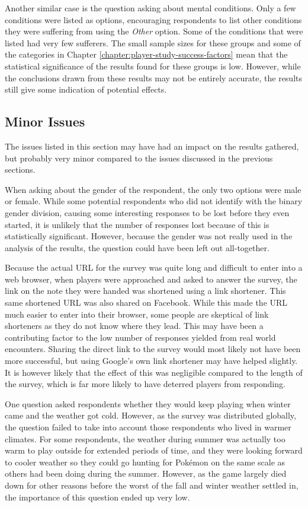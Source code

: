 Another similar case is the question asking about mental conditions. Only a few conditions were listed as options, encouraging respondents to list other conditions they were suffering from using the \emph{Other} option. Some of the conditions that were listed had very few sufferers. The small sample sizes for these groups and some of the categories in Chapter \ref{chapter:player-study-success-factors} mean that the statistical significance of the results found for these groups is low. However, while the conclusions drawn from these results may not be entirely accurate, the results still give some indication of potential effects.

\subsection{Minor Issues}

The issues listed in this section may have had an impact on the results gathered, but probably very minor compared to the issues discussed in the previous sections.

When asking about the gender of the respondent, the only two options were male or female. While some potential respondents who did not identify with the binary gender division, causing some interesting responses to be lost before they even started, it is unlikely that the number of responses lost because of this is statistically significant. However, because the gender was not really used in the analysis of the results, the question could have been left out all-together.

Because the actual URL for the survey was quite long and difficult to enter into a web browser, when players were approached and asked to answer the survey, the link on the note they were handed was shortened using a link shortener. This same shortened URL was also shared on Facebook. While this made the URL much easier to enter into their browser, some people are skeptical of link shorteners as they do not know where they lead. This may have been a contributing factor to the low number of responses yielded from real world encounters. Sharing the direct link to the survey would most likely not have been more successful, but using Google's own link shortener may have helped slightly. It is however likely that the effect of this was negligible compared to the length of the survey, which is far more likely to have deterred players from responding.

One question asked respondents whether they would keep playing when winter came and the weather got cold. However, as the survey was distributed globally, the question failed to take into account those respondents who lived in warmer climates. For some respondents, the weather during summer was actually too warm to play outside for extended periods of time, and they were looking forward to cooler weather so they could go hunting for Pokémon on the same scale as others had been doing during the summer. However, as the game largely died down for other reasons before the worst of the fall and winter weather settled in, the importance of this question ended up very low.

